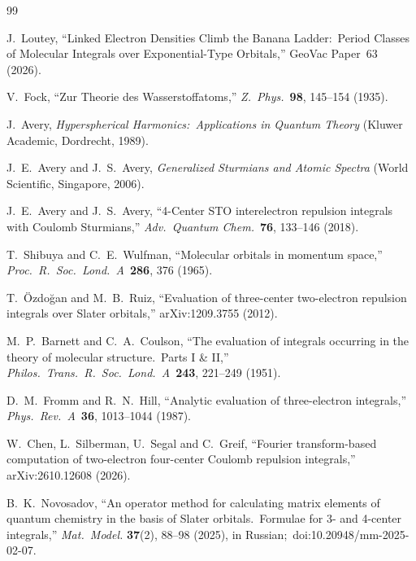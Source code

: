 \documentclass[aps,pra,twocolumn,superscriptaddress,longbibliography]{revtex4-2}
\begin{document}
\begin{thebibliography}{99}

J.~Loutey, ``Linked Electron Densities Climb the Banana Ladder:\ Period
Classes of Molecular Integrals over Exponential-Type Orbitals,'' GeoVac
Paper~63 (2026).

V.~Fock, ``Zur Theorie des Wasserstoffatoms,''
\textit{Z.\ Phys.}\ \textbf{98}, 145--154 (1935).

J.~Avery, \textit{Hyperspherical Harmonics:\ Applications in Quantum
Theory} (Kluwer Academic, Dordrecht, 1989).

J.~E.~Avery and J.~S.~Avery, \textit{Generalized Sturmians and Atomic
Spectra} (World Scientific, Singapore, 2006).

J.~E.~Avery and J.~S.~Avery, ``4-Center STO interelectron repulsion
integrals with Coulomb Sturmians,'' \textit{Adv.\ Quantum Chem.}\ \textbf{76},
133--146 (2018).

T.~Shibuya and C.~E.~Wulfman, ``Molecular orbitals in momentum space,''
\textit{Proc.\ R.\ Soc.\ Lond.\ A}\ \textbf{286}, 376 (1965).

T.~\"Ozdo\u{g}an and M.~B.~Ruiz, ``Evaluation of three-center two-electron
repulsion integrals over Slater orbitals,'' arXiv:1209.3755 (2012).

M.~P.~Barnett and C.~A.~Coulson, ``The evaluation of integrals occurring
in the theory of molecular structure.\ Parts I \& II,''
\textit{Philos.\ Trans.\ R.\ Soc.\ Lond.\ A}\ \textbf{243}, 221--249 (1951).

D.~M.~Fromm and R.~N.~Hill, ``Analytic evaluation of three-electron
integrals,'' \textit{Phys.\ Rev.\ A}\ \textbf{36}, 1013--1044 (1987).

W.~Chen, L.~Silberman, U.~Segal and C.~Greif, ``Fourier transform-based
computation of two-electron four-center Coulomb repulsion integrals,''
arXiv:2610.12608 (2026).

B.~K.~Novosadov, ``An operator method for calculating matrix elements of
quantum chemistry in the basis of Slater orbitals.\ Formulae for 3- and
4-center integrals,'' \textit{Mat.\ Model.} \textbf{37}(2), 88--98 (2025),
in Russian;\ doi:10.20948/mm-2025-02-07.


\end{thebibliography}
\end{document}
